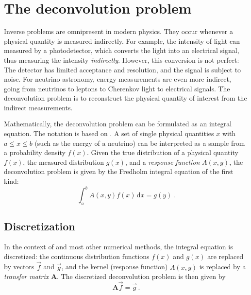 \section{The deconvolution problem} %
Inverse problems are omnipresent in modern physics.
They occur whenever a physical quantity is measured indirectly.
For example,
the intensity of light can measured by a photodetector,
  which converts the light into an electrical signal,
    thus measuring the intensity \emph{indirectly}.
However,
this conversion is not perfect:
The detector has limited acceptance and resolution,
and the signal is subject to noise.
For neutrino astronomy,
  energy measurements are even more indirect,
    going from neutrinos to leptons to Cherenkov light to electrical signals.
%
The deconvolution problem is to reconstruct the physical quantity of interest
  from the indirect measurements.

Mathematically,
the deconvolution problem can be formulated as an integral equation.
%
The notation is based on \citeauthor{blobel_deconvolution} \cite{blobel_deconvolution}.
A set of single physical quantities $x$
  with $a \leq x \leq b$ %
  (such as the energy of a neutrino)
can be interpreted as a sample from a probability density $f(x)$.
%
Given
  the true distribution of a physical quantity $f(x)$,
  the measured distribution $g(x)$,
  and a \emph{response function} $A(x, y)$,
the deconvolution problem is given by
the Fredholm integral equation of the first kind: \cite{blobel_deconvolution}
\begin{equation}
  \label{eq:deconvolution_problem:fredholm}
  \int_a^b A(x, y) f(x) \, \mathrm{d}x = g(y) \, .
\end{equation}


\subsection{Discretization}
In the context of \dsea{} and most other numerical methods,
the integral equation is discretized:
  the continuous distribution functions $f(x)$ and $g(x)$ are replaced by vectors $\vec{f}$ and $\vec{g}$,
  and the kernel (response function) $A(x, y)$ is replaced by a \emph{transfer matrix} $\symbf{A}$.
%
The discretized deconvolution problem is then given by
\begin{equation}
  \label{eq:deconvolution_problem:discretized}
  \symbf{A} \vec{f} = \vec{g} \, .
\end{equation}

